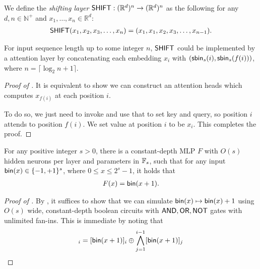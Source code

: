\begin{definition}\label{defi:shifting_layer}
    We define the \emph{shifting layer} $\mathsf{SHIFT}:(\mathbb{R}^d)^n\to (\mathbb{R}^d)^n$ as the following for any $d,n\in\mathbb{N}^+$ and $x_1,\ldots, x_n\in\mathbb{R}^{d}$:
    \begin{align}
        \mathsf{SHIFT}(x_1,x_2,x_3, \ldots,x_n) = (x_1,x_1,x_2,x_3,\ldots,x_{n-1}).
    \end{align}
\end{definition}

\begin{lemma}\label{lem:shifting_layer}
    For input sequence length up to some integer $n$, $\mathsf{SHIFT}$ could be implemented by a attention layer by concatenating each embedding $x_i$ with $(\mathsf{sbin}_s(i), \mathsf{sbin}_s(f(i)))$, where $n= \lceil \log_2 n +1\rceil$.
\end{lemma}

\begin{proof}[Proof of ]
    It is equivalent to show we can construct an attention heads which computes $x_{f(i)}$ at each position $i$. 

    To do so, we just need to invoke  and use that to set key and query, so position $i$ attends to position $f(i)$. We set value at position $i$ to be $x_i$. This completes the proof. 
\end{proof}


\begin{lemma}\label{lem:mlp_addition}
    For any positive integer $s>0$, there is a constant-depth MLP $F$ with $O(s)$ hidden neurons per layer and parameters in $\mathbb{F}_s$, such that for any input $\mathsf{bin}(x)\in\{-1,+1\}^s$, where $0\le x\le 2^s-1$, it holds that  
    \begin{align*}
        F(x) = \mathsf{bin}(x+1).
    \end{align*}
\end{lemma}

\begin{proof}[Proof of ]
    By , it suffices to show that we can simulate $\mathsf{bin}(x)\mapsto \mathsf{bin}(x)+1$ using $O(s)$ wide, constant-depth boolean circuits with $\mathsf{AND},\mathsf{OR},\mathsf{NOT}$ gates with unlimited fan-ins. This is immediate by noting that 
    \begin{align}
        [\bin(x+1)]_i = [\bin(x+1)]_i \oplus \bigwedge_{j=1}^{i-1}[\bin(x+1)]_j
    \end{align}
\end{proof}

